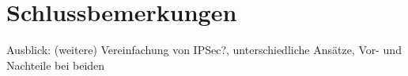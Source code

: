 \documentclass[12pt]{scrartcl}
\begin{document}
\section{Schlussbemerkungen}
Ausblick: (weitere) Vereinfachung von IPSec?, unterschiedliche Ansätze, Vor- und Nachteile bei beiden

\newpage

\printbibliography
{}


\newpage
{}
\end{document}
